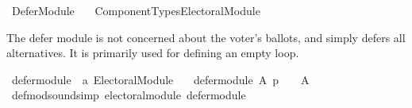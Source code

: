 %
\begin{isabellebody}%
%
%
\isadelimdocument
\isanewline
%
\endisadelimdocument
%
\isatagdocument
\isanewline
\isanewline
%
\isamarkuptrue%
%
\isamarkuptrue%
%
\endisatagdocument
{\isafolddocument}%
%
\isadelimdocument
%
\endisadelimdocument
%
\isadelimtheory
%
\endisadelimtheory
%
\isatagtheory
{}\isamarkupfalse%
\ Defer{\isacharunderscore}{\kern0pt}Module\isanewline
\ \ \ {\isachardoublequoteopen}Component{\isacharunderscore}{\kern0pt}Types{\isacharslash}{\kern0pt}Electoral{\isacharunderscore}{\kern0pt}Module{\isachardoublequoteclose}\isanewline
{}%
\endisatagtheory
{\isafoldtheory}%
%
\isadelimtheory
%
\endisadelimtheory
%
\begin{isamarkuptext}%
The defer module is not concerned about the voter's ballots, and
simply defers all alternatives.
It is primarily used for defining an empty loop.%
\end{isamarkuptext}\isamarkuptrue%
%
\isadelimdocument
%
\endisadelimdocument
%
\isatagdocument
%
\isamarkuptrue%
%
\endisatagdocument
{\isafolddocument}%
%
\isadelimdocument
%
\endisadelimdocument
{}\isamarkupfalse%
\ defer{\isacharunderscore}{\kern0pt}module\ {\isacharcolon}{\kern0pt}{\isacharcolon}{\kern0pt}\ {\isachardoublequoteopen}{\isacharprime}{\kern0pt}a\ Electoral{\isacharunderscore}{\kern0pt}Module{\isachardoublequoteclose}\ \isanewline
\ \ {\isachardoublequoteopen}defer{\isacharunderscore}{\kern0pt}module\ A\ p\ {\isacharequal}{\kern0pt}\ {\isacharparenleft}{\kern0pt}{\isacharbraceleft}{\kern0pt}{\isacharbraceright}{\kern0pt}{\isacharcomma}{\kern0pt}\ {\isacharbraceleft}{\kern0pt}{\isacharbraceright}{\kern0pt}{\isacharcomma}{\kern0pt}\ A{\isacharparenright}{\kern0pt}{\isachardoublequoteclose}%
\isadelimdocument
%
\endisadelimdocument
%
\isatagdocument
%
\isamarkuptrue%
%
\endisatagdocument
{\isafolddocument}%
%
\isadelimdocument
%
\endisadelimdocument
{}\isamarkupfalse%
\ def{\isacharunderscore}{\kern0pt}mod{\isacharunderscore}{\kern0pt}sound{\isacharbrackleft}{\kern0pt}simp{\isacharbrackright}{\kern0pt}{\isacharcolon}{\kern0pt}\ {\isachardoublequoteopen}electoral{\isacharunderscore}{\kern0pt}module\ defer{\isacharunderscore}{\kern0pt}module{\isachardoublequoteclose}\isanewline
%
\isadelimproof
\ \ %
\endisadelimproof
%
\isatagproof
{}\isamarkupfalse%

\end{isabellebody}
